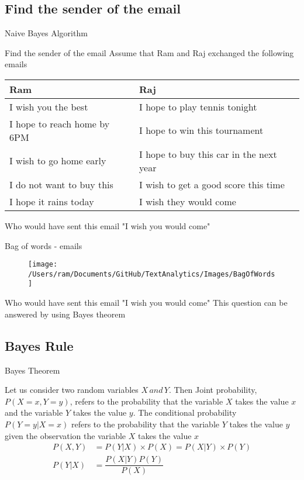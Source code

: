 \subsection{Find the sender of the email}

\begin{frame}{}
\LARGE Naive Bayes Algorithm
\end{frame}


\begin{frame}{Find the sender of the email}
Assume that Ram and Raj exchanged the following emails
\begin{table}
\begin{tabular}{|l|l|}
	\hline
	Ram&Raj\\
	\hline
	I wish you the best&I hope to play tennis tonight\\
	I hope to reach home by 6PM&I hope to win this tournament\\
	I wish to go home early&I hope to buy this car in the next year\\
	I do not want to buy this &I wish to get a good score this time\\
	I hope it rains today&I wish they would come\\
	\hline
\end{tabular}
\end{table}
\vspace{0.3mm}
Who would have sent this email "I wish you would come"
\end{frame}


\begin{frame}{Bag of words - emails }
\begin{figure}
	\centering
	\texttt{[image: /Users/ram/Documents/GitHub/TextAnalytics/Images/BagOfWords]}
	\label{fig:bagofwords}
\end{figure}
	Who would have sent this email "I wish you would come"
	\vspace{0.3mm}
	This question can be answered by using Bayes theorem
\end{frame}


\subsection{Bayes Rule}

\begin{frame}{Bayes Theorem}

Let us consider two random variables $X \, and \, Y$. Then
\vspace{0.3mm} Joint probability, $P(X=x,Y=y)$, refers to the probability that the variable $X$ takes the value $x$ and the variable $Y$ takes the value $y$.
\vspace{0.3mm}
The conditional probability $P(Y=y|X=x)$ refers to the probability that the variable $Y$ takes the value $y$ given the observation the variable $X$ takes the value $x$
\begin{align}
P(X,Y) &= P(Y|X)\times P(X) = P(X|Y)\times P(Y)\\
P(Y|X) &= \dfrac{P(X|Y)P(Y)}{P(X)}
\end{align}
\end{frame}

